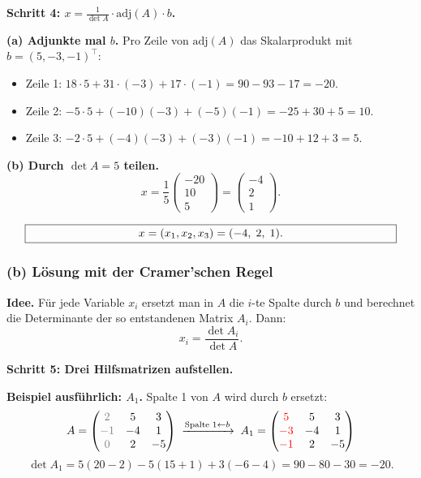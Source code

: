 \documentclass[a4paper,12pt]{article}
\begin{document}
\textbf{Schritt 4: $x = \tfrac{1}{\det A} \cdot \text{adj}(A) \cdot b$.}

\textbf{(a) Adjunkte mal $b$.} Pro Zeile von $\text{adj}(A)$ das Skalarprodukt mit $b = (5, -3, -1)^\top$:
\begin{itemize}[leftmargin=*, nosep]
    \item Zeile 1: $18 \cdot 5 + 31 \cdot (-3) + 17 \cdot (-1) = 90 - 93 - 17 = -20$.
    \item Zeile 2: $-5 \cdot 5 + (-10)(-3) + (-5)(-1) = -25 + 30 + 5 = 10$.
    \item Zeile 3: $-2 \cdot 5 + (-4)(-3) + (-3)(-1) = -10 + 12 + 3 = 5$.
\end{itemize}

\textbf{(b) Durch $\det A = 5$ teilen.}
\[
x = \frac{1}{5} \begin{pmatrix} -20 \\ 10 \\ 5 \end{pmatrix} = \begin{pmatrix} -4 \\ 2 \\ 1 \end{pmatrix}.
\]

\[
\fbox{\parbox{0.93\textwidth}{\centering
$x = (x_1, x_2, x_3) = (-4,\; 2,\; 1)$.
}}
\]

\subsubsection*{(b) L\"osung mit der Cramer'schen Regel}

\textbf{Idee.} F\"ur jede Variable $x_i$ ersetzt man in $A$ die $i$-te Spalte durch $b$ und berechnet die Determinante der so entstandenen Matrix $A_i$. Dann:
\[
x_i = \frac{\det A_i}{\det A}.
\]

\textbf{Schritt 5: Drei Hilfsmatrizen aufstellen.}

\textbf{Beispiel ausf\"uhrlich: $A_1$.} Spalte 1 von $A$ wird durch $b$ ersetzt:
\[
A = \begin{pmatrix} \color{gray}2 & 5 & 3 \\ \color{gray}{-1} & -4 & 1 \\ \color{gray}0 & 2 & -5 \end{pmatrix}
\;\xrightarrow{\text{Spalte 1} \leftarrow b}\;
A_1 = \begin{pmatrix} \color{red}5 & 5 & 3 \\ \color{red}{-3} & -4 & 1 \\ \color{red}{-1} & 2 & -5 \end{pmatrix}
\]
\[
\det A_1 = 5(20 - 2) - 5(15 + 1) + 3(-6 - 4) = 90 - 80 - 30 = -20.
\]
\end{document}
